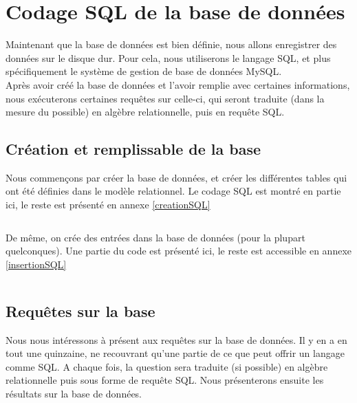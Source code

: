 \section{Codage SQL de la base de données}
Maintenant que la base de données est bien définie, nous allons enregistrer des données sur le disque dur. Pour cela, nous utiliserons le langage SQL, et plus spécifiquement le système de gestion de base de données MySQL.\\
Après avoir créé la base de données et l'avoir remplie avec certaines informations, nous exécuterons certaines requêtes sur celle-ci, qui seront traduite (dans la mesure du possible) en algèbre relationnelle, puis en requête SQL.

\subsection{Création et remplissable de la base}
Nous commençons par créer la base de données, et créer les différentes tables qui ont été définies dans le modèle relationnel. Le codage SQL est montré en partie ici, le reste est présenté en annexe \ref{creationSQL}
\inputminted[frame=leftline, lastline=37]{sql}{../SQL/creationBase.sql}

De même, on crée des entrées dans la base de données (pour la plupart quelconques). Une partie du code est présenté ici, le reste est accessible en annexe \ref{insertionSQL}
\inputminted[frame=leftline, lastline=27]{sql}{codes/insertBase.sql}

\subsection{Requêtes sur la base}
Nous nous intéressons à présent aux requêtes sur la base de données. Il y en a en tout une quinzaine, ne recouvrant qu'une partie de ce que peut offrir un langage comme SQL. A chaque fois, la question sera traduite (si possible) en algèbre relationnelle puis sous forme de requête SQL. Nous présenterons ensuite les résultats sur la base de données.

